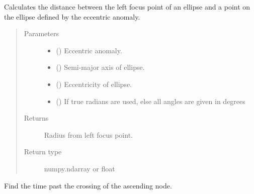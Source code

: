 \documentclass[letterpaper,10pt,english]{sphinxmanual}
\begin{document}
\begin{fulllineitems}
\label{\detokenize{modules/dpt_tools:dpt_tools.elliptic_radius}}
Calculates the distance between the left focus point of an ellipse and a point on the ellipse defined by the eccentric anomaly.
\begin{quote}\begin{description}
\item[{Parameters}] \leavevmode\begin{itemize}
\item {} 
 () \textendash{} Eccentric anomaly.

\item {} 
 () \textendash{} Semi-major axis of ellipse.

\item {} 
 () \textendash{} Eccentricity of ellipse.

\item {} 
 () \textendash{} If true radians are used, else all angles are given in degrees

\end{itemize}

\item[{Returns}] \leavevmode
Radius from left focus point.

\item[{Return type}] \leavevmode
numpy.ndarray or float

\end{description}\end{quote}

\end{fulllineitems}


\begin{fulllineitems}
\label{\detokenize{modules/dpt_tools:dpt_tools.find_ascending_node_time}}
Find the time past the crossing of the ascending node.

\end{fulllineitems}
\end{document}
